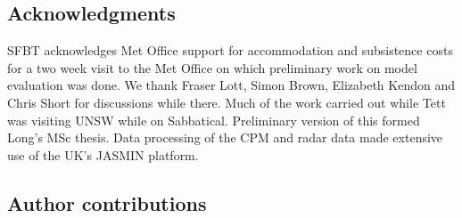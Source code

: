 \documentclass[11pt,a4paper]{article}
\begin{document}
\subsection*{Acknowledgments}
SFBT acknowledges  Met Office support for accommodation and subsistence costs for a two week visit to the Met Office on which preliminary work on model evaluation was done. We thank Fraser Lott, Simon Brown, Elizabeth Kendon and Chris Short for discussions while there. Much of the  work carried out while Tett was visiting UNSW while on Sabbatical. Preliminary version of this formed Long's MSc thesis. Data processing of the CPM and radar data made extensive use of the UK's JASMIN platform. 

\subsection*{Author contributions}

\clearpage




\clearpage



\clearpage
\end{document}
